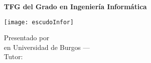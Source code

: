 \renewcommand\maketitle{
    \thispagestyle{empty}

    \cabecera
    \vfill

    \begin{minipage}{0.74\textwidth}
        \begin{tcolorbox}[
                colback=blue!10,
                colframe=blue!20!black!40,
                top=16pt,
                bottom=16pt
            ]
            \begin{center}
                \large\textbf{TFG del Grado en Ingeniería Informática}

                \bigbreak

                \LARGE\textbf{\thetitle}
            \end{center}
        \end{tcolorbox}
    \end{minipage}
    \hfill
    \begin{minipage}{0.2\textwidth}
        \texttt{[image: escudoInfor]}
    \end{minipage}


    \vfill

    \begin{center}
        \noindent\LARGE
        Presentado por \theauthor\\
        en Universidad de Burgos --- \thedate\\
        Tutor: \thetutor\\
    \end{center}

    \clearpage
}
\maketitle
